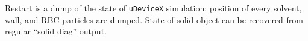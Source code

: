 Restart is a dump of the state of \texttt{uDeviceX} simulation:
position of every solvent, wall, and RBC particles are dumped. State
of solid object can be recovered from regular ``solid diag'' output.
